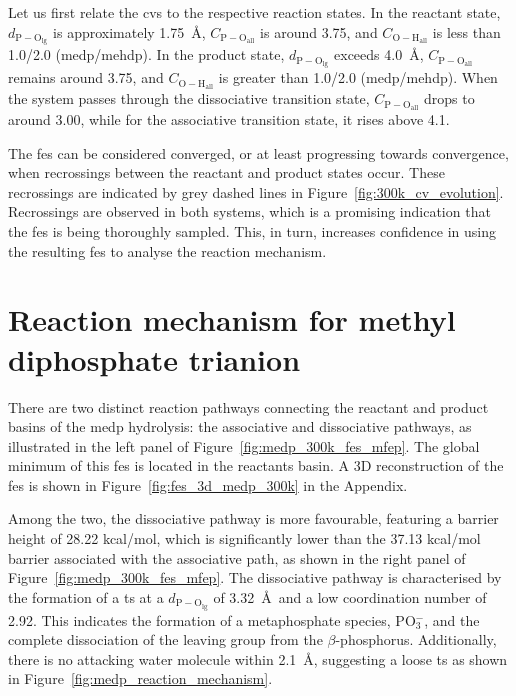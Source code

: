 Let us first relate the \acp{cv} to the respective reaction states. In the reactant state, $d_\mathrm{P-O_{\mathrm{lg}}}$ is approximately 1.75~\AA, $C_\mathrm{P-O_{\mathrm{all}}}$ is around 3.75, and $C_\mathrm{O-H_{\mathrm{all}}}$ is less than 1.0/2.0 (\ac{medp}/\ac{mehdp}). In the product state, $d_\mathrm{P-O_{\mathrm{lg}}}$ exceeds 4.0~\AA, $C_\mathrm{P-O_{\mathrm{all}}}$ remains around 3.75, and $C_\mathrm{O-H_{\mathrm{all}}}$ is greater than 1.0/2.0 (\ac{medp}/\ac{mehdp}). When the system passes through the dissociative transition state, $C_\mathrm{P-O_{\mathrm{all}}}$ drops to around 3.00, while for the associative transition state, it rises above 4.1.

The \ac{fes} can be considered converged, or at least progressing towards convergence, when recrossings between the reactant and product states occur. These recrossings are indicated by grey dashed lines in Figure~\ref{fig:300k_cv_evolution}. Recrossings are observed in both systems, which is a promising indication that the \ac{fes} is being thoroughly sampled. This, in turn, increases confidence in using the resulting \ac{fes} to analyse the reaction mechanism.


\section{Reaction mechanism for methyl diphosphate trianion}

There are two distinct reaction pathways connecting the reactant and product basins of the \ac{medp} hydrolysis: the associative and dissociative pathways, as illustrated in the left panel of Figure~\ref{fig:medp_300k_fes_mfep}. The global minimum of this \ac{fes} is located in the reactants basin. A 3D reconstruction of the \ac{fes} is shown in Figure~\ref{fig:fes_3d_medp_300k} in the Appendix.

Among the two, the dissociative pathway is more favourable, featuring a barrier height of 28.22 kcal/mol, which is significantly lower than the 37.13 kcal/mol barrier associated with the associative path, as shown in the right panel of Figure~\ref{fig:medp_300k_fes_mfep}. The dissociative pathway is characterised by the formation of a \ac{ts} at a $d_\mathrm{P-O_{\mathrm{lg}}}$ of 3.32~\AA\ and a low coordination number of 2.92. This indicates the formation of a metaphosphate species, PO$_3^-$, and the complete dissociation of the leaving group from the $\beta$-phosphorus. Additionally, there is no attacking water molecule within 2.1~\AA, suggesting a loose \ac{ts} as shown in Figure~\ref{fig:medp_reaction_mechanism}.

